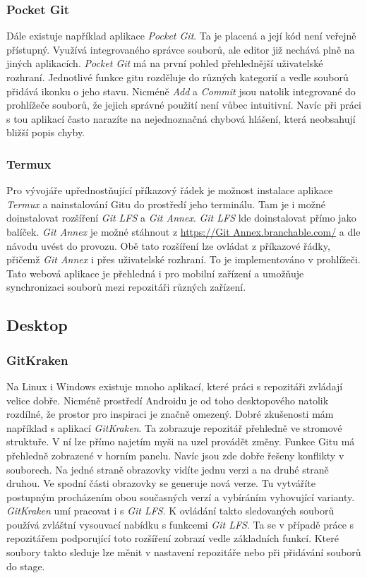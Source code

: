     \subsubsection{Pocket Git}
    Dále existuje například aplikace \emph{Pocket Git}. Ta je placená a její kód není veřejně přístupný. Využívá integrovaného správce souborů, ale editor již nechává plně na jiných aplikacích. \emph{Pocket Git} má na první pohled přehlednější uživatelské rozhraní. Jednotlivé funkce gitu rozděluje do různých kategorií a vedle souborů přidává ikonku o jeho stavu. Nicméně \emph{Add} a \emph{Commit} jsou natolik integrované do prohlížeče souborů, že jejich správné použití není vůbec intuitivní. Navíc při práci s tou aplikací často narazíte na nejednoznačná chybová hlášení, která neobsahují bližší popis chyby.

    \subsubsection{Termux}
    Pro vývojáře upřednostňující příkazový řádek je možnost instalace aplikace \emph{Termux} a nainstalování Gitu do prostředí jeho terminálu. Tam je i možné doinstalovat rozšíření \emph{Git LFS} a \emph{Git Annex}. \emph{Git LFS} lde doinstalovat přímo jako balíček. \emph{Git Annex} je možné stáhnout z \url{https://Git Annex.branchable.com/} a dle návodu uvést do provozu. Obě tato rozšíření lze ovládat z příkazové řádky, přičemž \emph{Git Annex} i přes uživatelské rozhraní. To je implementováno v prohlížeči. Tato webová aplikace je přehledná i pro mobilní zařízení a umožňuje synchronizaci souborů mezi repozitáři různých zařízení.

    \subsection {Desktop}
    \subsubsection{GitKraken}
    Na Linux i Windows existuje mnoho aplikací, které práci s repozitáři zvládají velice dobře. Nicméně prostředí Androidu je od toho desktopového natolik rozdílné, že prostor pro inspiraci je značně omezený. Dobré zkušenosti mám například s aplikací \emph{GitKraken}. Ta zobrazuje repozitář přehledně ve stromové struktuře. V ní lze přímo najetím myši na uzel provádět změny. Funkce Gitu má přehledně zobrazené v horním panelu. Navíc jsou zde dobře řešeny konflikty v souborech. Na jedné straně obrazovky vidíte jednu verzi a na druhé straně druhou. Ve spodní části obrazovky se generuje nová verze. Tu vytváříte postupným procházením obou současných verzí a vybíráním vyhovující varianty. \emph{GitKraken} umí pracovat i s \emph{Git LFS}. K ovládání takto sledovaných souborů používá zvláštní vysouvací nabídku s funkcemi \emph{Git LFS}. Ta se v případě práce s repozitářem podporující toto rozšíření zobrazí vedle základních funkcí. Které soubory takto sleduje lze měnit v nastavení repozitáře nebo při přidávání souborů do stage.


